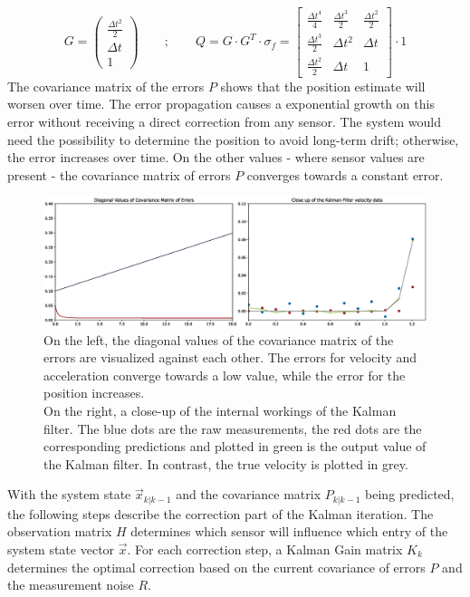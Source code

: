 \begin{equation*}
    G = 
    \begin{pmatrix}
        \frac{\Delta t^{2}}{2}  \\
        \Delta t  \\
        1 
    \end{pmatrix}
    \qquad ; \qquad
    Q = G\cdot G^{T}\cdot \sigma_{f} =
    \begin{bmatrix}
        \frac{\Delta t^{4}}{4} & \frac{\Delta t^{3}}{2} & \frac{\Delta t^{2}}{2} \\
        \frac{\Delta t^{3}}{2} & \Delta t^{2} & \Delta t \\
        \frac{\Delta t^{2}}{2} & \Delta t & 1
    \end{bmatrix}
    \cdot 1
\end{equation*}
The covariance matrix of the errors $P$ shows that the position estimate will worsen over time. The error propagation causes a exponential growth on this error without receiving a direct correction from any sensor. The system would need the possibility to determine the position to avoid long-term drift; otherwise, the error increases over time. On the other values - where sensor values are present - the covariance matrix of errors $P$ converges towards a constant error.
\begin{figure}[H]
    \centering
    \includegraphics[width=1.0\textwidth]{images/Kalman_example_1d_error.eps}
    \caption{On the left, the diagonal values of the covariance matrix of the errors are visualized against each other. The errors for velocity and acceleration converge towards a low value, while the error for the position increases.\\
    On the right, a close-up of the internal workings of the Kalman filter. The blue dots are the raw measurements, the red dots are the corresponding predictions and plotted in green is the output value of the Kalman filter. In contrast, the true velocity is plotted in grey.}
    \label{im:KalmanError}
\end{figure}
With the system state $\vec{x}_{k|k-1}$ and the covariance matrix $P_{k|k-1}$ being predicted, the following steps describe the correction part of the Kalman iteration. The observation matrix $H$ determines which sensor will influence which entry of the system state vector $\vec{x}$. For each correction step, a Kalman Gain matrix $K_{k}$ determines the optimal correction based on the current covariance of errors $P$ and the measurement noise $R$.
